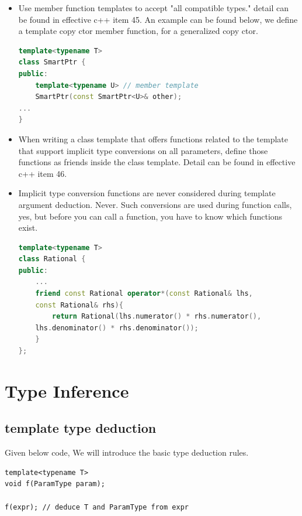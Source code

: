 \documentclass[a4paper,11pt,twoside]{book}
\begin{document}
\begin{itemize}
	\item Use member function templates to accept
	"all compatible types." detail can be found in effective c++ item 45. An example can be found below, we define a template copy ctor member function, for a generalized copy ctor.
	
\begin{lstlisting}[frame=single, language=c++]
template<typename T>
class SmartPtr {
public:
	template<typename U> // member template
	SmartPtr(const SmartPtr<U>& other); 
...
}
\end{lstlisting}
	
	\item When writing a class template that offers functions related to the template that support implicit type conversions on all parameters, define those functions as friends inside the class template. Detail can be found in effective c++ item 46.
	
	\item  Implicit type conversion functions are never considered
	during template argument deduction. Never. Such conversions are
	used during function calls, yes, but before you can call a function, you have to know which functions exist. 
	
\begin{lstlisting}[frame=single, language=c++]
template<typename T>
class Rational {
public:
	...
	friend const Rational operator*(const Rational& lhs, 
	const Rational& rhs){
		return Rational(lhs.numerator() * rhs.numerator(), 
	lhs.denominator() * rhs.denominator());  
	} 
};
\end{lstlisting}

\end{itemize}



\section{Type Inference}

\subsection{template type deduction}

Given below code, We will introduce the basic type deduction rules.
\begin{lstlisting}[numbers=none]
template<typename T>
void f(ParamType param);

f(expr); // deduce T and ParamType from expr
\end{lstlisting}
\end{document}
